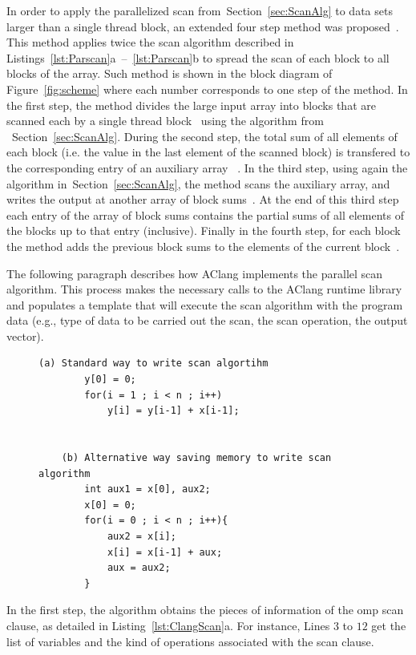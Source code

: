 \documentclass[Ingles]{ic-tese-v1}
\newcommand{\rsec}[1]{Section~\ref{sec:#1}}
\newcommand{\rfig}[1]{Figure~\ref{fig:#1}}
\newcommand{\rlst}[1]{Listing~\ref{lst:#1}}
\newcommand{\rlstn}[3]{Listings~\ref{lst:#1}{#2}~--~\ref{lst:#1}{#3}}
\begin{document}
In order to apply the  parallelized scan from~\rsec{ScanAlg} to data sets
larger than  a single thread block,  an extended four step  method was
proposed~\cite{harris2007parallel}. This method applies twice the  scan
algorithm described in \rlstn{Parscan}{a}{b} to spread the scan of each
block to all blocks  of the array.  Such method is  shown in the block
diagram of \rfig{scheme} where each  number corresponds to one step of
the method.   In the first  step, the  method divides the  large input
array  into  blocks  that  are   scanned  each  by  a  single  thread
block~ using  the algorithm  from ~\rsec{ScanAlg}.   During the
second step,  the total sum  of all elements  of each block  (i.e. the
value in the  last element of the scanned block)  is transfered to the
corresponding entry of  an auxiliary array ~.   In the third
step, using again  the algorithm in~\rsec{ScanAlg}, the  method scans the
auxiliary  array, and  writes the  output  at another  array of  block
sums~.  At  the end  of this  third step  each entry  of the
array of block  sums contains the partial sums of  all elements of the
blocks up to that entry (inclusive).   Finally in the fourth step,
for each block the method adds the previous block sums  to the elements of the current
block~.

The following paragraph describes how AClang implements the parallel scan
algorithm. This process makes the necessary calls to the AClang runtime library
and populates a template that will execute the scan algorithm with the program
data (e.g., type of data to be carried out the scan, the scan operation, the
output vector).

\begin{figure}[t]
	\lstset{basicstyle=\scriptsize}
	\begin{lstlisting}[label=lst:ScanKind, caption={Pseudocode of Scan Parallel implementation in Aclang}, escapeinside={}]
	(a) Standard way to write scan algortihm
		y[0] = 0;
		for(i = 1 ; i < n ; i++)
			y[i] = y[i-1] + x[i-1];


	(b) Alternative way saving memory to write scan algorithm
		int aux1 = x[0], aux2;
		x[0] = 0;
		for(i = 0 ; i < n ; i++){
			aux2 = x[i];
			x[i] = x[i-1] + aux;
			aux = aux2;
		}

	\end{lstlisting}
\end{figure}

In the first step, the algorithm obtains the pieces of information of the omp
scan clause, as detailed in \rlst{ClangScan}{a}. For
instance, Lines $3$ to $12$ get the list of variables and the kind of operations
associated with the scan clause.
\end{document}
